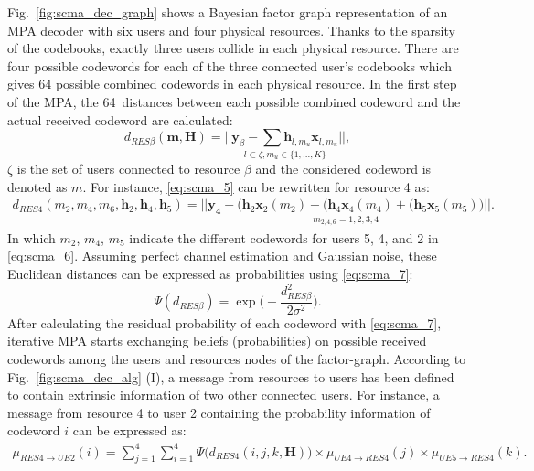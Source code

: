 Fig.~\ref{fig:scma_dec_graph} shows a Bayesian factor graph representation of an
MPA decoder with six users and four physical resources. Thanks to the sparsity
of the codebooks, exactly three users collide in each physical resource. There
are four possible codewords for each of the three connected user's codebooks
which gives 64 possible combined codewords in each physical resource. In the
first step of the MPA, the 64~distances between each possible combined codeword
and the actual received codeword are calculated:
\begin{equation}
  \label{eq:scma_5}
  d_{RES  \beta}(\bm{m}, \bm{H}) =
  \underset{l \subset \zeta, m_u\in\{1,...,K\}}{||\bm{y}_\beta -
  \sum \bm{h}_{l,m_u} \bm{x}_{l,m_u} ||},
\end{equation}
$\zeta$ is the set of users connected to resource $\beta$ and the
considered codeword is denoted as $m$. For instance, \eqref{eq:scma_5} can be
rewritten for resource 4 as:
\begin{equation}
  \label{eq:scma_6}
  \begin{split}
  d_{RES 4}(m_2,m_4,m_6,\bm{h}_2, \bm{h}_4, \bm{h}_5) =
  \underset{m_{2,4,6}=1,2,3,4}{|| \bm{y_4} - \Big(\bm{h}_2\bm{x}_2(m_2) +
  (\bm{h}_4\bm{x}_4(m_4) + (\bm{h}_5\bm{x}_5(m_5) \Big) ||}.
  \end{split}
\end{equation}
In which $m_2$, $m_4$, $m_5$ indicate the different codewords for users 5, 4,
and 2 in \eqref{eq:scma_6}. Assuming perfect channel estimation and Gaussian
noise, these Euclidean distances can be expressed as probabilities using
\eqref{eq:scma_7}:
\begin{equation}
  \label{eq:scma_7}
  \Psi(d_{RES \beta}) = \exp \Bigg(-\frac{d_{RES \beta}^2}{2\sigma^2} \Bigg).
\end{equation}
After calculating the residual probability of each codeword with
\eqref{eq:scma_7}, iterative MPA starts exchanging beliefs (probabilities) on
possible received codewords among the users and resources nodes of the
factor-graph. According to Fig.~\ref{fig:scma_dec_alg} (I), a message from
resources to users has been defined to contain extrinsic information of two
other connected users. For instance, a message from resource 4 to user 2
containing the probability information of codeword $i$ can be expressed as:
\begin{equation}
  \label{eq:scma_8}
  \begin{split}
  \mu_{RES4 \rightarrow UE2}(i) = \sum\limits_{j=1}^4 \sum\limits_{i=1}^4 \Psi
  \Big(d_{RES4}(i,j,k,\bm{H}) \Big)
  \times \mu_{UE4 \rightarrow RES4}(j) \times \mu_{UE5 \rightarrow RES4}(k).
  \end{split}
\end{equation}
